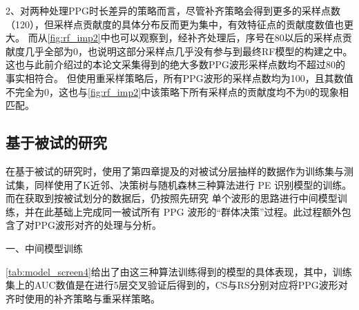 2、对两种处理PPG时长差异的策略而言，尽管补齐策略会得到更多的采样点数（120），但采样点贡献度的具体分布反而更为集中，有效特征点的贡献度数值也更大。
而从\autoref{fig:rf_imp2}中也可以观察到，经补齐处理后，序号在80以后的采样点贡献度几乎全部为0，也说明这部分采样点几乎没有参与到最终RF模型的构建之中。
这也与此前介绍过的本论文采集得到的绝大多数PPG波形采样点数均不超过80的事实相符合。
但使用重采样策略后，所有PPG波形的采样点数均为100，且其数值不完全为0，这也与\autoref{fig:rf_imp2}中该策略下所有采样点的贡献度均不为0的现象相匹配。

\subsection{基于被试的研究}
在基于被试的研究时，使用了第四章提及的对被试分层抽样的数据作为训练集与测试集，同样使用了K近邻、决策树与随机森林三种算法进行 PE 识别模型的训练。
而在获取到按被试划分的数据后，仍按照先研究
单个波形的思路进行中间模型训练，并在此基础上完成同一被试所有 PPG 波形的“群体决策”过程。此过程额外包含了对PPG波形对齐的处理与分析。

一、中间模型训练

\autoref{tab:model_screen4}给出了由这三种算法训练得到的模型的具体表现，其中，训练集上的AUC数值是在进行5层交叉验证后得到的，CS与RS分别对应将PPG波形对齐时使用的补齐策略与重采样策略。

